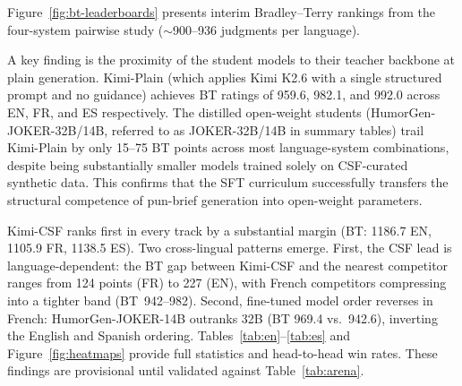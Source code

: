 \documentclass[]{ceurart}
\begin{document}
Figure~\ref{fig:bt-leaderboards} presents interim Bradley--Terry rankings
from the four-system pairwise study (${\sim}$900--936 judgments per language).

A key finding is the proximity of the student models to their teacher backbone
at plain generation.
Kimi-Plain (which applies Kimi K2.6 with a single structured prompt and no
guidance) achieves BT ratings of 959.6, 982.1, and 992.0 across EN, FR, and
ES respectively.
The distilled open-weight students (HumorGen-JOKER-32B/14B, referred to as
JOKER-32B/14B in summary tables) trail Kimi-Plain by only 15--75 BT points
across most language-system combinations, despite being substantially smaller
models trained solely on CSF-curated synthetic data.
This confirms that the SFT curriculum successfully transfers the structural
competence of pun-brief generation into open-weight parameters.

Kimi-CSF ranks first in every track by a substantial margin
(BT: 1186.7 EN, 1105.9 FR, 1138.5 ES).
Two cross-lingual patterns emerge.
First, the CSF lead is language-dependent: the BT gap between Kimi-CSF and the
nearest competitor ranges from 124 points (FR) to 227 (EN), with French
competitors compressing into a tighter band (BT~942--982).
Second, fine-tuned model order reverses in French: HumorGen-JOKER-14B outranks
32B (BT 969.4 vs.\ 942.6), inverting the English and Spanish ordering.
Tables~\ref{tab:en}--\ref{tab:es} and Figure~\ref{fig:heatmaps} provide full
statistics and head-to-head win rates.
These findings are provisional until validated against Table~\ref{tab:arena}.
\end{document}
